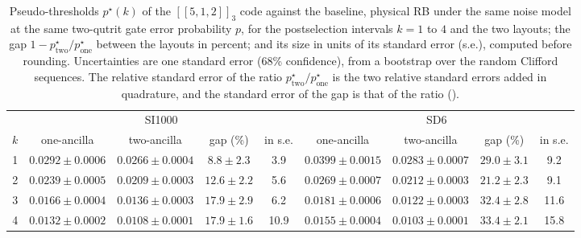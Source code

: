 \begin{table}[tp]
  \centering
  \small
  \setlength{\tabcolsep}{4pt}
  \begin{tabular}{c|cccc|cccc}
    \hline
    & \multicolumn{4}{c|}{SI1000} & \multicolumn{4}{c}{SD6} \\
    $k$ & one-ancilla & two-ancilla & gap (\%) & in s.e. & one-ancilla & two-ancilla & gap (\%) & in s.e. \\
    \hline
    1 & $0.0292 \pm 0.0006$ & $0.0266 \pm 0.0004$ & $8.8 \pm 2.3$ & 3.9 & $0.0399 \pm 0.0015$ & $0.0283 \pm 0.0007$ & $29.0 \pm 3.1$ & 9.2 \\
    2 & $0.0239 \pm 0.0005$ & $0.0209 \pm 0.0003$ & $12.6 \pm 2.2$ & 5.6 & $0.0269 \pm 0.0007$ & $0.0212 \pm 0.0003$ & $21.2 \pm 2.3$ & 9.1 \\
    3 & $0.0166 \pm 0.0004$ & $0.0136 \pm 0.0003$ & $17.9 \pm 2.9$ & 6.2 & $0.0181 \pm 0.0006$ & $0.0122 \pm 0.0003$ & $32.4 \pm 2.8$ & 11.6 \\
    4 & $0.0132 \pm 0.0002$ & $0.0108 \pm 0.0001$ & $17.9 \pm 1.6$ & 10.9 & $0.0155 \pm 0.0004$ & $0.0103 \pm 0.0001$ & $33.4 \pm 2.1$ & 15.8 \\
    \hline
  \end{tabular}
  \caption{Pseudo-thresholds $p^\star(k)$ of the $[[5,1,2]]_3$ code against the baseline, physical RB under the same noise model at the same two-qutrit gate error probability $p$, for the postselection intervals $k = 1$ to $4$ and the two layouts; the gap $1 - p^\star_{\mathrm{two}}/p^\star_{\mathrm{one}}$ between the layouts in percent; and its size in units of its standard error (s.e.), computed before rounding. Uncertainties are one standard error (68\% confidence), from a bootstrap over the random Clifford sequences. The relative standard error of the ratio $p^\star_{\mathrm{two}}/p^\star_{\mathrm{one}}$ is the two relative standard errors added in quadrature, and the standard error of the gap is that of the ratio ().}
  \label{tab:pseudo_thresholds}
\end{table}

